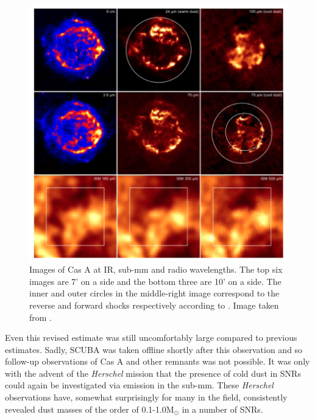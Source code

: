 \begin{figure}
\centering
\includegraphics[clip=true,scale=0.425,trim= 0 0 0 0]{chapters/chapter1/figs/CasA.png}
\caption{Images of Cas A at IR, sub-mm and radio wavelengths.  The top six images are 7' on a side and the bottom three are 10' on a side.  The inner and outer circles in the middle-right image correspond to the reverse and forward shocks respectively according to \citep{Gotthelf2001}.  Image taken from \citet{Barlow2010}.}
\label{fig:CasA}
\end{figure}


Even this revised estimate was still uncomfortably large compared to previous estimates.  Sadly, SCUBA was taken offline shortly after this observation and so follow-up observations of Cas A and other remnants was not possible.  It was only with the advent of the \textit{Herschel} mission that the presence of cold dust in SNRs could again be investigated via emission in the sub-mm.  These \textit{Herschel} observations have, somewhat surprisingly for many in the field, consistently revealed dust masses of the order of 0.1-1.0M$_{\odot}$ in a number of SNRs.


